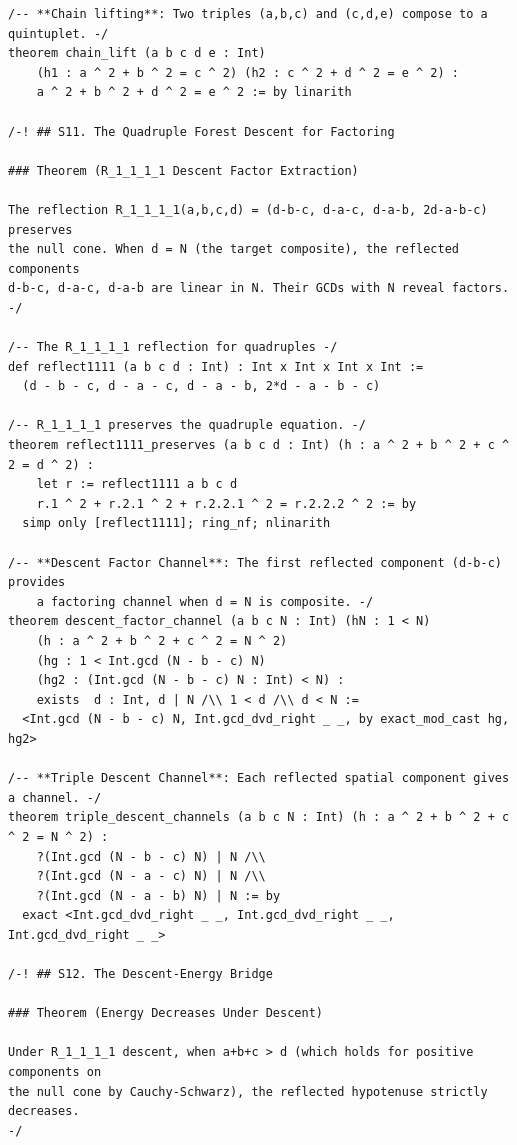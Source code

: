 \documentclass[11pt,openright,twoside]{book}
\theoremstyle{definition}
\begin{document}
\begin{lstlisting}[style=lean]
/-- **Chain lifting**: Two triples (a,b,c) and (c,d,e) compose to a quintuplet. -/
theorem chain_lift (a b c d e : Int)
    (h1 : a ^ 2 + b ^ 2 = c ^ 2) (h2 : c ^ 2 + d ^ 2 = e ^ 2) :
    a ^ 2 + b ^ 2 + d ^ 2 = e ^ 2 := by linarith

/-! ## S11. The Quadruple Forest Descent for Factoring

### Theorem (R_1_1_1_1 Descent Factor Extraction)

The reflection R_1_1_1_1(a,b,c,d) = (d-b-c, d-a-c, d-a-b, 2d-a-b-c) preserves
the null cone. When d = N (the target composite), the reflected components
d-b-c, d-a-c, d-a-b are linear in N. Their GCDs with N reveal factors.
-/

/-- The R_1_1_1_1 reflection for quadruples -/
def reflect1111 (a b c d : Int) : Int x Int x Int x Int :=
  (d - b - c, d - a - c, d - a - b, 2*d - a - b - c)

/-- R_1_1_1_1 preserves the quadruple equation. -/
theorem reflect1111_preserves (a b c d : Int) (h : a ^ 2 + b ^ 2 + c ^ 2 = d ^ 2) :
    let r := reflect1111 a b c d
    r.1 ^ 2 + r.2.1 ^ 2 + r.2.2.1 ^ 2 = r.2.2.2 ^ 2 := by
  simp only [reflect1111]; ring_nf; nlinarith

/-- **Descent Factor Channel**: The first reflected component (d-b-c) provides
    a factoring channel when d = N is composite. -/
theorem descent_factor_channel (a b c N : Int) (hN : 1 < N)
    (h : a ^ 2 + b ^ 2 + c ^ 2 = N ^ 2)
    (hg : 1 < Int.gcd (N - b - c) N)
    (hg2 : (Int.gcd (N - b - c) N : Int) < N) :
    exists  d : Int, d | N /\\ 1 < d /\\ d < N :=
  <Int.gcd (N - b - c) N, Int.gcd_dvd_right _ _, by exact_mod_cast hg, hg2>

/-- **Triple Descent Channel**: Each reflected spatial component gives a channel. -/
theorem triple_descent_channels (a b c N : Int) (h : a ^ 2 + b ^ 2 + c ^ 2 = N ^ 2) :
    ?(Int.gcd (N - b - c) N) | N /\\
    ?(Int.gcd (N - a - c) N) | N /\\
    ?(Int.gcd (N - a - b) N) | N := by
  exact <Int.gcd_dvd_right _ _, Int.gcd_dvd_right _ _, Int.gcd_dvd_right _ _>

/-! ## S12. The Descent-Energy Bridge

### Theorem (Energy Decreases Under Descent)

Under R_1_1_1_1 descent, when a+b+c > d (which holds for positive components on
the null cone by Cauchy-Schwarz), the reflected hypotenuse strictly decreases.
-/


\end{lstlisting}
\end{document}
